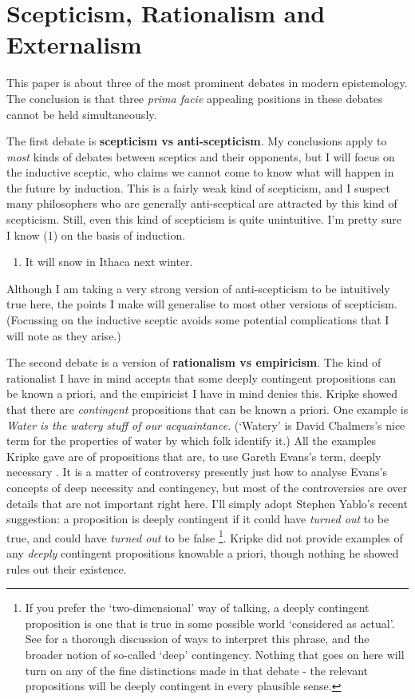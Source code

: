 \hypertarget{scepticism-rationalism-and-externalism}{%
\section{Scepticism, Rationalism and
Externalism}\label{scepticism-rationalism-and-externalism}}

This paper is about three of the most prominent debates in modern
epistemology. The conclusion is that three \emph{prima facie} appealing
positions in these debates cannot be held simultaneously.

The first debate is \textbf{scepticism vs anti-scepticism}. My
conclusions apply to \emph{most} kinds of debates between sceptics and
their opponents, but I will focus on the inductive sceptic, who claims
we cannot come to know what will happen in the future by induction. This
is a fairly weak kind of scepticism, and I suspect many philosophers who
are generally anti-sceptical are attracted by this kind of scepticism.
Still, even this kind of scepticism is quite unintuitive. I'm pretty
sure I know (1) on the basis of induction.

\begin{enumerate}
\item
  It will snow in Ithaca next winter.
\end{enumerate}

Although I am taking a very strong version of anti-scepticism to be
intuitively true here, the points I make will generalise to most other
versions of scepticism. (Focussing on the inductive sceptic avoids some
potential complications that I will note as they arise.)

The second debate is a version of \textbf{rationalism vs empiricism}.
The kind of rationalist I have in mind accepts that some deeply
contingent propositions can be known a priori, and the empiricist I have
in mind denies this. Kripke showed that there are \emph{contingent}
propositions that can be known a priori. One example is \emph{Water is
the watery stuff of our acquaintance}. (`Watery' is David Chalmers's
nice term for the properties of water by which folk identify it.) All
the examples Kripke gave are of propositions that are, to use Gareth
Evans's term, deeply necessary \citep{Evans1979}. It is a matter of
controversy presently just how to analyse Evans's concepts of deep
necessity and contingency, but most of the controversies are over
details that are not important right here. I'll simply adopt Stephen
Yablo's recent suggestion: a proposition is deeply contingent if it
could have \emph{turned out} to be true, and could have \emph{turned
out} to be false \citep{Yablo2002}\footnote{If you prefer the
  `two-dimensional' way of talking, a deeply contingent proposition is
  one that is true in some possible world `considered as actual'. See
  \citet{Chalmers2006} for a thorough discussion of ways to interpret
  this phrase, and the broader notion of so-called `deep' contingency.
  Nothing that goes on here will turn on any of the fine distinctions
  made in that debate - the relevant propositions will be deeply
  contingent in every plausible sense.}. Kripke did not provide examples
of any \emph{deeply} contingent propositions knowable a priori, though
nothing he showed rules out their existence.

